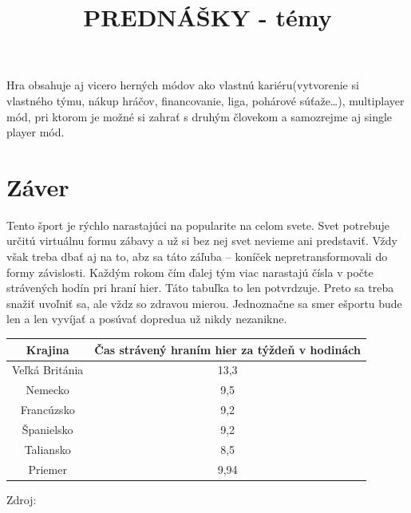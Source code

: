 \documentclass[10pt,oneside,slovak,a4paper]{article}
\begin{document}
Hra obsahuje aj vicero herných módov ako vlastnú kariéru(vytvorenie si vlastného týmu, nákup hráčov, financovanie, liga, pohárové súťaže…), multiplayer mód, pri ktorom je možné si zahrať s druhým človekom a samozrejme aj single player mód. \cite{a1}

\newpage
\section{Záver} \label{zaver} %

Tento šport je rýchlo narastajúci na popularite na celom svete. Svet potrebuje určitú virtuálnu formu zábavy a už si bez nej svet nevieme ani predstaviť. Vždy však treba dbať aj na to, abz sa táto záľuba – koníček nepretransformovali do formy závislosti. Každým rokom čím ďalej tým viac narastajú čísla v počte strávených hodín pri hraní hier. Táto tabuľka to len potvrdzuje. Preto sa treba snažiť uvoľniť sa, ale vždz so zdravou mierou. Jednoznačne sa smer ešportu bude len a len vyvíjať a posúvať dopredua už nikdy nezanikne. 

\begin{center}
\begin{tabular}{||c c||} 
 \hline
 Krajina & Čas strávený hraním hier za týždeň v hodinách \\ [0.8ex] 
 \hline\hline
 Veľká Británia & 13,3 \\ 
 \hline
 Nemecko & 9,5\\
 \hline
 Francúzsko & 9,2 \\
 \hline
 Španielsko &  9,2 \\
 \hline
 Taliansko & 8,5 \\ 
 \hline
Priemer & 9,94 \\ [1ex] 
 \hline
\end{tabular}
\newline Zdroj: \cite{a7}
\end{center}






\newpage
\title{PREDNÁŠKY - témy}
\maketitle\newline
\end{document}
